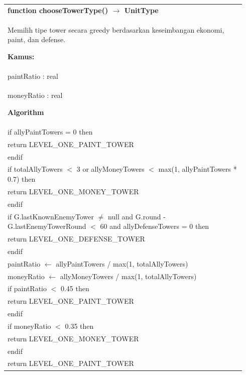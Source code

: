 \documentclass{article}
\newenvironment{pseudobox}
{
\centering
\begin{longtable}{|p{0.94\linewidth}|}
\hline
}
{
\\ \hline
\end{longtable}
\vspace{0.05cm}
}
\begin{document}
\begin{pseudobox}
\textbf{function chooseTowerType() $\rightarrow$ UnitType} \\
{ Memilih tipe tower secara greedy berdasarkan keseimbangan ekonomi, paint, dan defense. }

\textbf{Kamus:} \\
\hspace*{1em} paintRatio : real \\
\hspace*{1em} moneyRatio : real

\textbf{Algorithm} \\
\hspace*{1em} if allyPaintTowers = 0 then \\
\hspace*{2em} return LEVEL\_ONE\_PAINT\_TOWER \\
\hspace*{1em} endif \\

\hspace*{1em} if totalAllyTowers $<$ 3 or allyMoneyTowers $<$ max(1, allyPaintTowers * 0.7) then \\
\hspace*{2em} return LEVEL\_ONE\_MONEY\_TOWER \\
\hspace*{1em} endif \\

\hspace*{1em} if G.lastKnownEnemyTower $\neq$ null and G.round - G.lastEnemyTowerRound $<$ 60 and allyDefenseTowers = 0 then \\
\hspace*{2em} return LEVEL\_ONE\_DEFENSE\_TOWER \\
\hspace*{1em} endif \\

\hspace*{1em} paintRatio $\leftarrow$ allyPaintTowers / max(1, totalAllyTowers) \\
\hspace*{1em} moneyRatio $\leftarrow$ allyMoneyTowers / max(1, totalAllyTowers) \\

\hspace*{1em} if paintRatio $<$ 0.45 then \\
\hspace*{2em} return LEVEL\_ONE\_PAINT\_TOWER \\
\hspace*{1em} endif \\

\hspace*{1em} if moneyRatio $<$ 0.35 then \\
\hspace*{2em} return LEVEL\_ONE\_MONEY\_TOWER \\
\hspace*{1em} endif \\

\hspace*{1em} return LEVEL\_ONE\_PAINT\_TOWER
\end{pseudobox}
\end{document}

